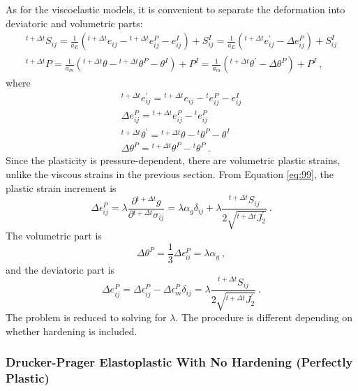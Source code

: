 As for the viscoelastic models, it is convenient to separate the deformation
into deviatoric and volumetric parts:
\begin{gather}
^{t+\Delta t}S_{ij}=\frac{1}{a_{E}}\left(^{t+\Delta t}e_{ij}-\phantom{}^{t+\Delta t}e_{ij}^{P}-e_{ij}^{I}\right)+S_{ij}^{I}=\frac{1}{a_{E}}\left(^{t+\Delta t}e_{ij}^{\prime}-\Delta e_{ij}^{P}\right)+S_{ij}^{I}\label{eq:105}\\
^{t+\Delta t}P=\frac{1}{a_{m}}\left(^{t+\Delta t}\theta-\phantom{}^{t+\Delta t}\theta^{P}-\theta^{I}\right)+P^{I}=\frac{1}{a_{m}}\left(^{t+\Delta t}\theta^{\prime}-\Delta\theta^{P}\right)+P^{I}\:,\nonumber 
\end{gather}
where
\begin{gather}
^{t+\Delta t}e_{ij}^{\prime}=\phantom{}^{t+\Delta t}e_{ij}-\phantom{}^{t}e_{ij}^{P}-e_{ij}^{I}\nonumber \\
\Delta e_{ij}^{P}=\phantom{}^{t+\Delta t}e_{ij}^{P}-\phantom{}^{t}e_{ij}^{P}\nonumber \\
^{t+\Delta t}\theta^{\prime}=\phantom{}^{t+\Delta t}\theta-\phantom{}^{t}\theta^{P}-\theta^{I}\nonumber \\
\Delta\theta^{P}=\phantom{}^{t+\Delta t}\theta^{P}-\phantom{}^{t}\theta^{P}\:.\label{eq:106}
\end{gather}
Since the plasticity is pressure-dependent, there are volumetric plastic
strains, unlike the viscous strains in the previous section. From
Equation \ref{eq:99}, the plastic strain increment is
\begin{equation}
\Delta\epsilon_{ij}^{P}=\lambda\frac{\partial\phantom{}^{t+\Delta t}g}{\partial\phantom{}^{t+\Delta t}\sigma_{ij}}=\lambda\alpha_{g}\delta_{ij}+\lambda\frac{^{t+\Delta t}S_{ij}}{2\sqrt{^{t+\Delta t}J_{2}^{\prime}}}\:.\label{eq:107}
\end{equation}
The volumetric part is
\begin{equation}
\Delta\theta^{P}=\frac{1}{3}\Delta\epsilon_{ii}^{P}=\lambda\alpha_{g}\:,\label{eq:108}
\end{equation}
and the deviatoric part is
\begin{equation}
\Delta e_{ij}^{P}=\Delta\epsilon_{ij}^{P}-\Delta\epsilon_{m}^{P}\delta_{ij}=\lambda\frac{^{t+\Delta t}S_{ij}}{2\sqrt{^{t+\Delta t}J_{2}^{\prime}}}\:.\label{eq:109}
\end{equation}
The problem is reduced to solving for $\lambda$. The procedure is
different depending on whether hardening is included.


\subsubsection{Drucker-Prager Elastoplastic With No Hardening (Perfectly Plastic)}

